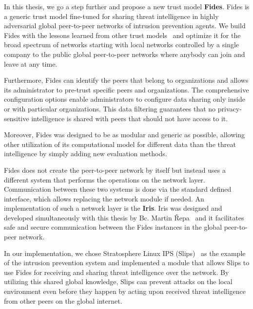 In this thesis, we go a step further and propose a new trust model \textbf{Fides}.
Fides is a generic trust model fine-tuned for sharing threat intelligence in highly adversarial global peer-to-peer networks of intrusion prevention agents.
We build Fides with the lessons learned from other trust models~\cite{sort, dita} and optimize it for the broad spectrum of networks starting with local networks controlled by a single company to the public global peer-to-peer networks where anybody can join and leave at any time.

Furthermore, Fides can identify the peers that belong to organizations and allows its administrator to pre-trust specific peers and organizations. The comprehensive configuration options enable administrators to configure data sharing only inside or with particular organizations. This data filtering guarantees that no privacy-sensitive intelligence is shared with peers that should not have access to it.

Moreover, Fides was designed to be as modular and generic as possible, allowing other utilization of its computational model for different data than the threat intelligence by simply adding new evaluation methods.

Fides does not create the peer-to-peer network by itself but instead uses a different system that performs the operations on the network layer.
Communication between these two systems is done via the standard defined interface, which allows replacing the network module if needed.
An implementation of such a network layer is the \textbf{Iris}. Iris was designed and developed simultaneously with this thesis by Bc. Martin Řepa~\cite{nl} and it facilitates safe and secure communication between the Fides instances in the global peer-to-peer network.

In our implementation, we chose Stratosphere Linux IPS (Slips)~\cite{slips} as the example of the intrusion prevention system and implemented a module that allows Slips to use Fides for receiving and sharing threat intelligence over the network. 
By utilizing this shared global knowledge, Slips can prevent attacks on the local environment even before they happen by acting upon received threat intelligence from other peers on the global internet.




